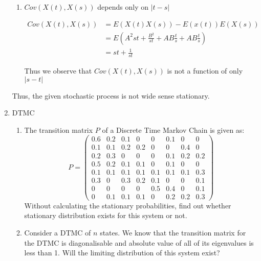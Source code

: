 \documentclass[12pt, oneside]{article}
\begin{document}
\begin{enumerate}
{\begin{enumerate}
{            In this case, we have \(E(A^2) = var(A) + [E(A)]^2 = 1 = E(B^2)\), then
            \begin{align*}
                E(X^2(t)) &= E\left(A^2t^2 + \frac{B^2}{t^2} + 2AB\right) \\
                \intertext{Now using linearity of expectations, \(E(A^2) = 1 = E(B^2)\) and \(E(AB) = E(A)E(B) = 0\)}
                E(X^2(t)) &= t^2 + \frac{1}{t^2} < \infty \,\forall\, t > 0
            \end{align*}
        }
        \item {
            \(Cov(X(t), X(s))\) depends only on \(|t - s|\)

            \begin{align*}
                Cov(X(t), X(s)) &= E(X(t)X(s)) - E(x(t))E(X(s)) \\
                                &= E\left(A^2st + \frac{B^2}{st} + AB\frac{t}{s} + AB\frac{t}{s}\right) \\
                                &= st + \frac{1}{st}
            \end{align*}

            Thus we observe that \(Cov(X(t), X(s))\) is not a function of only \(|s - t|\)
        }
    \end{enumerate}

    Thus, the given stochastic process is not wide sense stationary.
}

\item {
    DTMC

    \begin{enumerate}
        \item {
            The transition matrix \(P\) of a Discrete Time Markov Chain is given as:
            \[P = \begin{pmatrix}
                0.6 & 0.2 & 0.1 & 0 & 0 & 0.1 & 0 & 0 \\
                0.1	& 0.1 & 0.2 & 0.2 & 0 & 0 & 0.4 & 0 \\
                0.2 & 0.3 & 0 & 0 & 0 & 0.1 & 0.2 & 0.2 \\
                0.5 & 0.2 & 0.1 & 0.1 & 0 & 0.1 & 0 & 0 \\
                0.1 & 0.1 & 0.1 & 0.1 & 0.1 & 0.1 & 0.1 & 0.3 \\
                0.3 & 0 & 0.3 & 0.2 & 0.1 & 0 & 0 & 0.1 \\
                0 & 0 & 0 & 0 & 0.5 & 0.4 & 0 & 0.1 \\
                0 & 0.1 & 0.1 & 0.1 & 0 & 0.2 & 0.2 & 0.3
            \end{pmatrix}\]
            Without calculating the stationary probabilities, find out whether stationary
            distribution exists for this system or not.
        }
        \item {
            Consider a DTMC of \(n\) states. We know that the transition matrix for the
            DTMC is diagonalisable and absolute value of all of its eigenvalues is less than 1.
            Will the limiting distribution of this system exist?

}
\end{enumerate}}
\end{enumerate}
\end{document}
